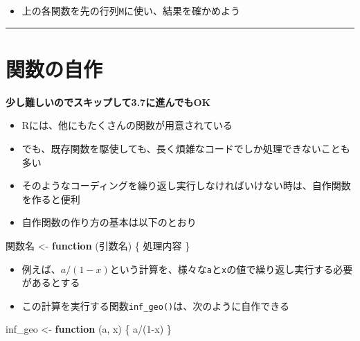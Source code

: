 \documentclass[
]{book}
\newenvironment{Shaded}{\begin{snugshade}}{\end{snugshade}}
\newcommand{\ControlFlowTok}[1]{\textcolor[rgb]{0.13,0.29,0.53}{\textbf{#1}}}
\newcommand{\DecValTok}[1]{\textcolor[rgb]{0.00,0.00,0.81}{#1}}
\newcommand{\NormalTok}[1]{#1}
\newcommand{\OtherTok}[1]{\textcolor[rgb]{0.56,0.35,0.01}{#1}}
\newcommand{\SpecialCharTok}[1]{\textcolor[rgb]{0.00,0.00,0.00}{#1}}
\providecommand{\tightlist}{%
  \setlength{\itemsep}{0pt}\setlength{\parskip}{0pt}}
\begin{document}
\begin{itemize}
\tightlist
\item
  上の各関数を先の行列\texttt{M}に使い、結果を確かめよう
\end{itemize}

\begin{center}\rule{0.5\linewidth}{0.5pt}\end{center}

\hypertarget{ux95a2ux6570ux306eux81eaux4f5c}{%
\section{関数の自作}\label{ux95a2ux6570ux306eux81eaux4f5c}}

\textbf{少し難しいのでスキップして3.7に進んでもOK }

\begin{itemize}
\tightlist
\item
  Rには、他にもたくさんの関数が用意されている
\item
  でも、既存関数を駆使しても、長く煩雑なコードでしか処理できないことも多い
\item
  そのようなコーディングを繰り返し実行しなければいけない時は、自作関数を作ると便利
\item
  自作関数の作り方の基本は以下のとおり
\end{itemize}

\begin{Shaded}
\begin{Highlighting}[]
\NormalTok{関数名 }\OtherTok{\textless{}{-}} \ControlFlowTok{function}\NormalTok{ (引数名) \{}
\NormalTok{  処理内容}
\NormalTok{\}}
\end{Highlighting}
\end{Shaded}

\begin{itemize}
\tightlist
\item
  例えば、\(a/(1-x)\)という計算を、様々な\texttt{a}と\texttt{x}の値で繰り返し実行する必要があるとする
\item
  この計算を実行する関数\texttt{inf\_geo()}は、次のように自作できる
\end{itemize}

\begin{Shaded}
\begin{Highlighting}[]
\NormalTok{inf\_geo }\OtherTok{\textless{}{-}} \ControlFlowTok{function}\NormalTok{ (a, x) \{}
\NormalTok{  a}\SpecialCharTok{/}\NormalTok{(}\DecValTok{1}\SpecialCharTok{{-}}\NormalTok{x)}
\NormalTok{\}}
\end{Highlighting}
\end{Shaded}
\end{document}

